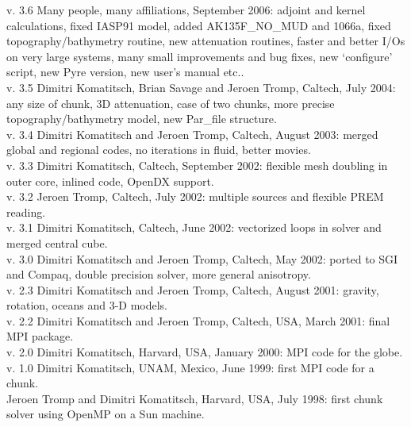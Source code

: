 \documentclass[oneside,english]{book}
\begin{document}
 v. 3.6 Many people, many affiliations, September 2006:
      adjoint and kernel calculations, fixed IASP91 model,
      added AK135F\_NO\_MUD and 1066a, fixed topography/bathymetry routine,
      new attenuation routines, faster and better I/Os on very large
      systems, many small improvements and bug fixes, new `configure'
      script, new Pyre version, new user's manual etc..\\

 v. 3.5 Dimitri Komatitsch, Brian Savage and Jeroen Tromp, Caltech, July 2004:
      any size of chunk, 3D attenuation, case of two chunks,
      more precise topography/bathymetry model, new Par\_file structure.\\

 v. 3.4 Dimitri Komatitsch and Jeroen Tromp, Caltech, August 2003:
      merged global and regional codes, no iterations in fluid, better movies.\\

 v. 3.3 Dimitri Komatitsch, Caltech, September 2002:
      flexible mesh doubling in outer core, inlined code, OpenDX support.\\

 v. 3.2 Jeroen Tromp, Caltech, July 2002:
      multiple sources and flexible PREM reading.\\

 v. 3.1 Dimitri Komatitsch, Caltech, June 2002:
      vectorized loops in solver and merged central cube.\\

 v. 3.0 Dimitri Komatitsch and Jeroen Tromp, Caltech, May 2002:
   ported to SGI and Compaq, double precision solver, more general anisotropy.\\

 v. 2.3 Dimitri Komatitsch and Jeroen Tromp, Caltech, August 2001:
                       gravity, rotation, oceans and 3-D models.\\

 v. 2.2 Dimitri Komatitsch and Jeroen Tromp, Caltech, USA, March 2001:
                       final MPI package.\\

 v. 2.0 Dimitri Komatitsch, Harvard, USA, January 2000: MPI code for the globe.\\

 v. 1.0 Dimitri Komatitsch, UNAM, Mexico, June 1999: first MPI code for a chunk.\\

 Jeroen Tromp and Dimitri Komatitsch, Harvard, USA, July 1998: first chunk solver using OpenMP on a Sun machine.\\
\end{document}
